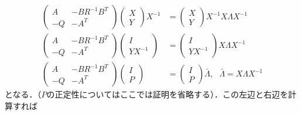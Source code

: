 \begin{align}
	\left(\begin{array}{cc}
	       A  & - B R^{-1} B^T \\
	       -Q & - A^T
	\end{array}\right)
		 \left(\begin{array}{c}
		      X \\
		      Y
		\end{array}\right)
		X^{-1}
	&= 
		 \left(\begin{array}{cccc}
		      X \\
		      Y
		\end{array}\right)
		X^{-1} X \Lambda
		X^{-1}
\nonumber \\
	\left(\begin{array}{cc}
	       A  & - B R^{-1} B^T \\
	       -Q & - A^T
	\end{array}\right)
		 \left(\begin{array}{c}
		      I \\
		      YX^{-1}
		\end{array}\right)
	&= 
		 \left(\begin{array}{cccc}
		      I \\
		      YX^{-1}
		\end{array}\right)
		X \Lambda
		X^{-1}
\nonumber \\
	\left(\begin{array}{cc}
	       A  & - B R^{-1} B^T \\
	       -Q & - A^T
	\end{array}\right)
		 \left(\begin{array}{c}
		      I \\
		      P
		\end{array}\right)
	&= 
		 \left(\begin{array}{cccc}
		      I \\
		      P
		\end{array}\right)
		\bar{\Lambda}
		, \ \ \ 
		\bar{\Lambda} = X \Lambda X^{-1}
\end{align}
となる．（$P$の正定性についてはここでは証明を省略する）．この左辺と右辺を計算すれば
